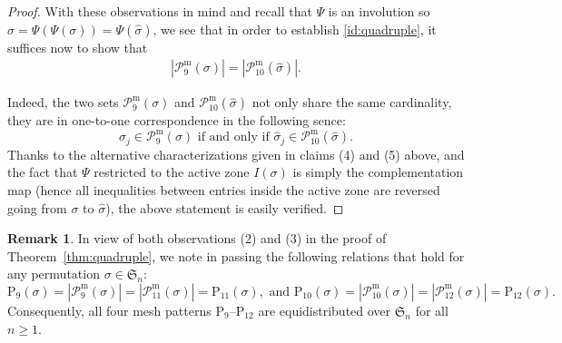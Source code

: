 \documentclass[12pt,reqno]{article}
\numberwithin{equation}{section}
\theoremstyle{plain}
\theoremstyle{definition}
\newtheorem{remark}[theorem]{Remark}
\def\fS{\mathfrak{S}}
\def\rP{\mathrm{P}}
\def\cP{\mathcal{P}}
\begin{document}
\begin{proof}
With these observations in mind and recall that $\Psi$ is an involution so $\sigma=\Psi(\Psi(\sigma))=\Psi(\hat{\sigma})$, we see that in order to establish \eqref{id:quadruple}, it suffices now to show that
\begin{align*}
|\cP_9^{\mathrm{m}}(\sigma)|=|\cP_{10}^{\mathrm{m}}(\hat{\sigma})|.
\end{align*}

Indeed, the two sets $\cP_9^{\mathrm{m}}(\sigma)$ and $\cP_{10}^{\mathrm{m}}(\hat{\sigma})$ not only share the same cardinality, they are in one-to-one correspondence in the following sence:
$$\sigma_j\in \cP_{9}^{\mathrm{m}}(\sigma)\text{ if and only if } \hat{\sigma}_j\in \cP_{10}^{\mathrm{m}}(\hat{\sigma}).$$
Thanks to the alternative characterizations given in claims (4) and (5) above, and the fact that $\Psi$ restricted to the active zone $I(\sigma)$ is simply the complementation map (hence all inequalities between entries inside the active zone are reversed going from $\sigma$ to $\hat{\sigma}$), the above statement is easily verified.
\end{proof}

\begin{remark}
In view of both observations (2) and (3) in the proof of Theorem~\ref{thm:quadruple}, we note in passing the following relations that hold for any permutation $\sigma\in\fS_n$:
$$\rP_9(\sigma)=|\cP_9^{\mathrm{m}}(\sigma)|=|\cP_{11}^{\mathrm{m}}(\sigma)|=\rP_{11}(\sigma),\text{ and } \rP_{10}(\sigma)=|\cP_{10}^{\mathrm{m}}(\sigma)|=|\cP_{12}^{\mathrm{m}}(\sigma)|=\rP_{12}(\sigma).$$
Consequently, all four mesh patterns $\rP_9$--$\rP_{12}$ are equidistributed over $\fS_n$ for all $n\ge 1$.
\end{remark}
\end{document}
